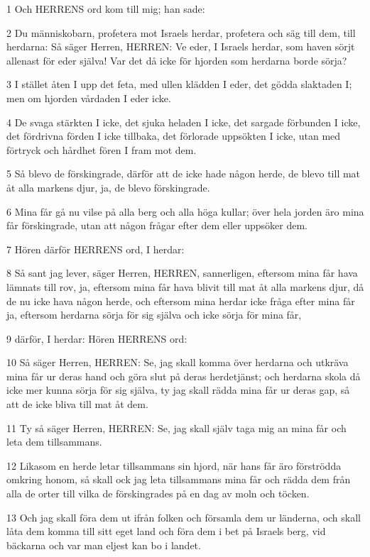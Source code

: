 \par 1 Och HERRENS ord kom till mig; han sade:
\par 2 Du människobarn, profetera mot Israels herdar, profetera och säg till dem, till herdarna: Så säger Herren, HERREN: Ve eder, I Israels herdar, som haven sörjt allenast för eder själva! Var det då icke för hjorden som herdarna borde sörja?
\par 3 I stället åten I upp det feta, med ullen klädden I eder, det gödda slaktaden I; men om hjorden vårdaden I eder icke.
\par 4 De svaga stärkten I icke, det sjuka heladen I icke, det sargade förbunden I icke, det fördrivna förden I icke tillbaka, det förlorade uppsökten I icke, utan med förtryck och hårdhet fören I fram mot dem.
\par 5 Så blevo de förskingrade, därför att de icke hade någon herde, de blevo till mat åt alla markens djur, ja, de blevo förskingrade.
\par 6 Mina får gå nu vilse på alla berg och alla höga kullar; över hela jorden äro mina får förskingrade, utan att någon frågar efter dem eller uppsöker dem.
\par 7 Hören därför HERRENS ord, I herdar:
\par 8 Så sant jag lever, säger Herren, HERREN, sannerligen, eftersom mina får hava lämnats till rov, ja, eftersom mina får hava blivit till mat åt alla markens djur, då de nu icke hava någon herde, och eftersom mina herdar icke fråga efter mina får ja, eftersom herdarna sörja för sig själva och icke sörja för mina får,
\par 9 därför, I herdar: Hören HERRENS ord:
\par 10 Så säger Herren, HERREN: Se, jag skall komma över herdarna och utkräva mina får ur deras hand och göra slut på deras herdetjänst; och herdarna skola då icke mer kunna sörja för sig själva, ty jag skall rädda mina får ur deras gap, så att de icke bliva till mat åt dem.
\par 11 Ty så säger Herren, HERREN: Se, jag skall själv taga mig an mina får och leta dem tillsammans.
\par 12 Likasom en herde letar tillsammans sin hjord, när hans får äro förströdda omkring honom, så skall ock jag leta tillsammans mina får och rädda dem från alla de orter till vilka de förskingrades på en dag av moln och töcken.
\par 13 Och jag skall föra dem ut ifrån folken och församla dem ur länderna, och skall låta dem komma till sitt eget land och föra dem i bet på Israels berg, vid bäckarna och var man eljest kan bo i landet.
